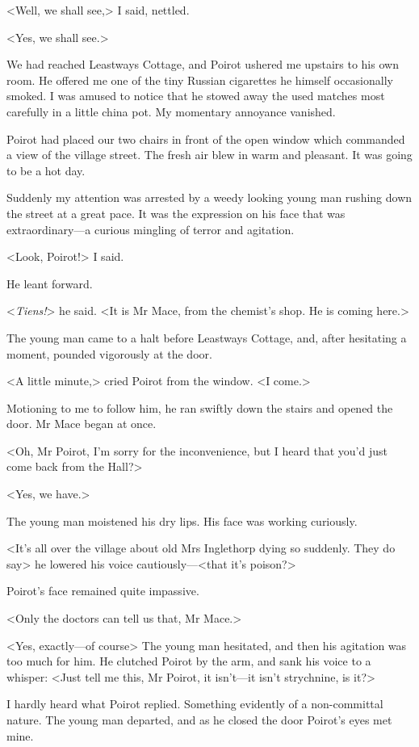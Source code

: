  <Well, we shall see,> I said, nettled. 

 <Yes, we shall see.> 

 We had reached Leastways Cottage, and Poirot ushered me upstairs to his own room. He offered me one of the tiny Russian cigarettes he himself occasionally smoked. I was amused to notice that he stowed away the used matches most carefully in a little china pot. My momentary annoyance vanished. 

 Poirot had placed our two chairs in front of the open window which commanded a view of the village street. The fresh air blew in warm and pleasant. It was going to be a hot day. 

 Suddenly my attention was arrested by a weedy looking young man rushing down the street at a great pace. It was the expression on his face that was extraordinary—a curious mingling of terror and agitation. 

 <Look, Poirot!> I said. 

 He leant forward. 

 <\emph{Tiens!}> he said. <It is Mr Mace, from the chemist's shop. He is coming here.> 

 The young man came to a halt before Leastways Cottage, and, after hesitating a moment, pounded vigorously at the door. 

 <A little minute,> cried Poirot from the window. <I come.> 

 Motioning to me to follow him, he ran swiftly down the stairs and opened the door. Mr Mace began at once. 

 <Oh, Mr Poirot, I'm sorry for the inconvenience, but I heard that you'd just come back from the Hall?> 

 <Yes, we have.> 

 The young man moistened his dry lips. His face was working curiously. 

 <It's all over the village about old Mrs Inglethorp dying so suddenly. They do say\longdash> he lowered his voice cautiously—<that it's poison?> 

 Poirot's face remained quite impassive. 

 <Only the doctors can tell us that, Mr Mace.> 

 <Yes, exactly—of course\longdash> The young man hesitated, and then his agitation was too much for him. He clutched Poirot by the arm, and sank his voice to a whisper: <Just tell me this, Mr Poirot, it isn't—it isn't strychnine, is it?> 

 I hardly heard what Poirot replied. Something evidently of a non-committal nature. The young man departed, and as he closed the door Poirot's eyes met mine. 

